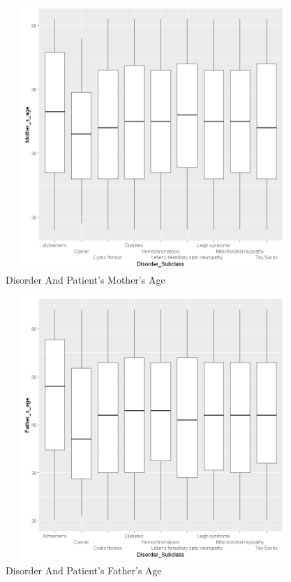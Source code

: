 \begin{figure}[htpb]
	\centering
	\includegraphics[height=10cm, width=12cm]{figures/m-age.png}
	\caption{Disorder And Patient's Mother's Age }
	\label{fig 19}
\end{figure}
\begin{figure}[htpb]
	\centering
	\includegraphics[height=10cm, width=12cm]{figures/f-age.png}
	\caption{Disorder And Patient's Father's Age }
	\label{fig 20}
\end{figure}
